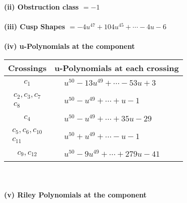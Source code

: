 \documentclass[1p]{elsarticle_modified}
\theoremstyle{definition}
\begin{document}
\flushleft \textbf{(ii) Obstruction class $= -1$}\\~\\
\flushleft \textbf{(iii) Cusp Shapes $= -4 u^{47}+104 u^{45}+\cdots-4 u-6$}\\~\\
\newpage\renewcommand{\arraystretch}{1}
\flushleft \textbf{(iv) u-Polynomials at the component}\newline \\
\begin{tabular}{m{50pt}|m{274pt}}
Crossings & \hspace{64pt}u-Polynomials at each crossing \\
\hline $$\begin{aligned}c_{1}\end{aligned}$$&$\begin{aligned}
&u^{50}-13 u^{49}+\cdots-53 u+3
\end{aligned}$\\
\hline $$\begin{aligned}c_{2},c_{3},c_{7}\\c_{8}\end{aligned}$$&$\begin{aligned}
&u^{50}- u^{49}+\cdots+u-1
\end{aligned}$\\
\hline $$\begin{aligned}c_{4}\end{aligned}$$&$\begin{aligned}
&u^{50}- u^{49}+\cdots+35 u-29
\end{aligned}$\\
\hline $$\begin{aligned}c_{5},c_{6},c_{10}\\c_{11}\end{aligned}$$&$\begin{aligned}
&u^{50}+u^{49}+\cdots- u-1
\end{aligned}$\\
\hline $$\begin{aligned}c_{9},c_{12}\end{aligned}$$&$\begin{aligned}
&u^{50}-9 u^{49}+\cdots+279 u-41
\end{aligned}$\\
\hline
\end{tabular}\\~\\
\newpage\renewcommand{\arraystretch}{1}
\flushleft \textbf{(v) Riley Polynomials at the component}\newline \\
\end{document}
